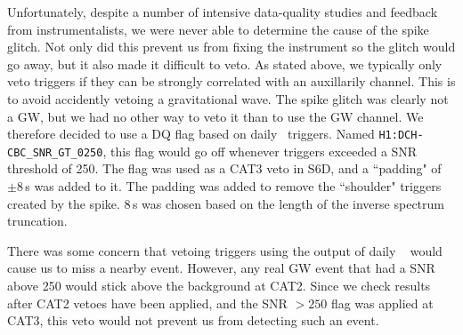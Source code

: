 Unfortunately, despite a number of intensive data-quality studies and feedback
from instrumentalists, we were never able to determine the cause of the spike
glitch. Not only did this prevent us from fixing the instrument so the glitch
would go away, but it also made it difficult to veto. As stated above, we
typically only veto triggers if they can be strongly correlated with an
auxillarily channel. This is to avoid accidently vetoing a gravitational wave.
The spike glitch was clearly not a \ac{GW}, but we had no other way to veto it
than to use the \ac{GW} channel. We therefore decided to use a DQ flag based on
daily \ihope~triggers. Named \verb|H1:DCH-CBC_SNR_GT_0250|, this flag would go
off whenever triggers exceeded a \ac{SNR} threshold of 250. The flag was used
as a CAT3 veto in S6D, and a ``padding" of $\pm8\,$s was added to it. The
padding was added to remove the ``shoulder" triggers created by the spike.
$8\,$s was chosen based on the length of the inverse spectrum truncation.

There was some concern that vetoing triggers using the output of daily \ihope~
would cause us to miss a nearby event. However, any real GW event that had
a SNR above 250 would stick above the background at CAT2. Since we check
results after CAT2 vetoes have been applied, and the SNR $> 250$ flag was
applied at CAT3, this veto would not prevent us from detecting such an event.

